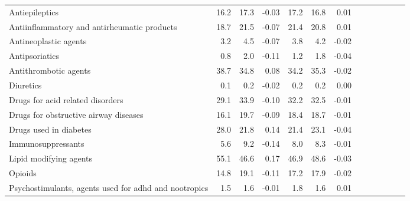 \documentclass[11pt,]{article}
\begin{document}
\begin{longtable}{lrrrrrrrrrrrr}
      Antiepileptics & 16.2 & 17.3 & -0.03 & 17.2 & 16.8 &  0.01 \\ 
      Antiinflammatory and antirheumatic products & 18.7 & 21.5 & -0.07 & 21.4 & 20.8 &  0.01 \\ 
      Antineoplastic agents &  3.2 &  4.5 & -0.07 &  3.8 &  4.2 & -0.02 \\ 
      Antipsoriatics &  0.8 &  2.0 & -0.11 &  1.2 &  1.8 & -0.04 \\ 
      Antithrombotic agents & 38.7 & 34.8 &  0.08 & 34.2 & 35.3 & -0.02 \\ 
      Diuretics &  0.1 &  0.2 & -0.02 &  0.2 &  0.2 &  0.00 \\ 
      Drugs for acid related disorders & 29.1 & 33.9 & -0.10 & 32.2 & 32.5 & -0.01 \\ 
      Drugs for obstructive airway diseases & 16.1 & 19.7 & -0.09 & 18.4 & 18.7 & -0.01 \\ 
      Drugs used in diabetes & 28.0 & 21.8 &  0.14 & 21.4 & 23.1 & -0.04 \\ 
      Immunosuppressants &  5.6 &  9.2 & -0.14 &  8.0 &  8.3 & -0.01 \\ 
      Lipid modifying agents & 55.1 & 46.6 &  0.17 & 46.9 & 48.6 & -0.03 \\ 
      Opioids & 14.8 & 19.1 & -0.11 & 17.2 & 17.9 & -0.02 \\ 
      Psychostimulants, agents used for adhd and nootropics &  1.5 &  1.6 & -0.01 &  1.8 &  1.6 &  0.01 \\ 
   \bottomrule\end{longtable}
\clearpage
{}
\end{document}
